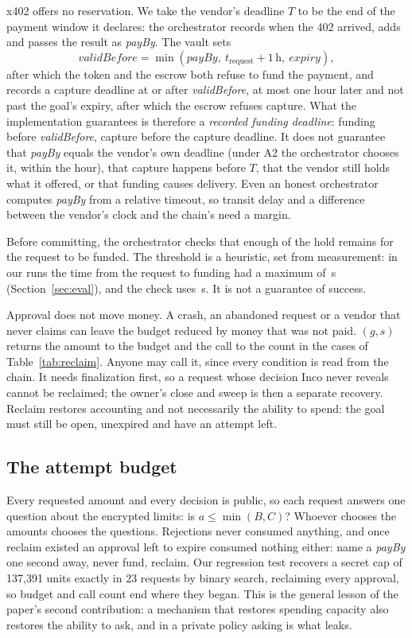 x402 offers no reservation. We take the vendor's deadline $T$ to be the end of the payment window it declares: the orchestrator records when the
402 arrived, adds  and passes the result as \textit{payBy}. The vault sets
\[
  \mathit{validBefore} = \min(\mathit{payBy},\ t_{\mathrm{request}} + 1\,\mathrm{h},\ \mathit{expiry}),
\]
after which the token and the escrow both refuse to fund the payment, and records a capture deadline at or after \textit{validBefore}, at most one
hour later and not past the goal's expiry, after which the escrow refuses capture. What the implementation guarantees is therefore a
\emph{recorded funding deadline}: funding before \textit{validBefore}, capture before the capture deadline. It does not guarantee that
\textit{payBy} equals the vendor's own deadline (under A2 the orchestrator chooses it, within the hour), that capture happens before $T$, that the
vendor still holds what it offered, or that funding causes delivery. Even an honest orchestrator computes \textit{payBy} from a relative timeout, so
transit delay and a difference between the vendor's clock and the chain's need a margin.

Before committing, the orchestrator checks that enough of the hold remains for the request to be funded. The threshold is a heuristic, set from
measurement: in our runs the time from the request to funding had a maximum of \fundingmax\,s (Section~\ref{sec:eval}), and the check uses
\fundingcheck\,s. It is not a guarantee of success.

Approval does not move money. A crash, an abandoned request or a vendor that never claims can leave the budget reduced by money that was not paid.
$(g, s)$ returns the amount to the budget and the call to the count in the cases of Table~\ref{tab:reclaim}. Anyone may call it, since
every condition is read from the chain. It needs finalization first, so a request whose decision Inco never reveals cannot be reclaimed; the owner's
close and sweep is then a separate recovery. Reclaim restores accounting and not necessarily the ability to spend: the goal must still be open, unexpired
and have an attempt left.

\subsection{The attempt budget}
\label{sec:attempts}

Every requested amount and every decision is public, so each request answers one question about the encrypted limits: is $a \le \min(B, C)$?
Whoever chooses the amounts chooses the questions. Rejections never consumed anything, and once reclaim existed an approval left to expire consumed
nothing either: name a \textit{payBy} one second away, never fund, reclaim. Our regression test recovers a secret cap of 137{,}391 units exactly in 23
requests by binary search, reclaiming every approval, so budget and call count end where they began. This is the general lesson of the paper's second
contribution: a mechanism that restores spending capacity also restores the ability to ask, and in a private policy asking is what leaks.


